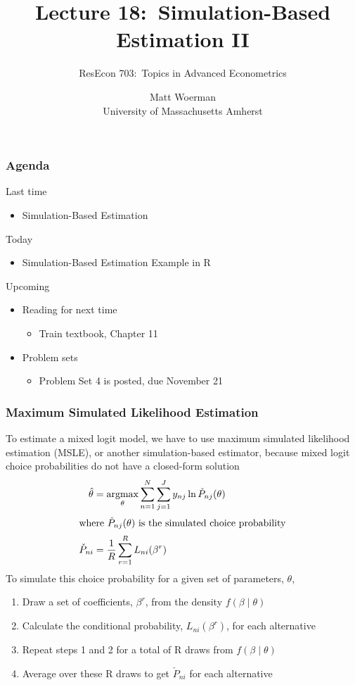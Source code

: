 \documentclass{beamer}\usepackage[]{graphicx}\usepackage[]{color}
\title[Lecture 18:\ Simulation-Based Estimation II]{Lecture 18:\ Simulation-Based Estimation II}
\author[ResEcon 703:\ Advanced Econometrics]{ResEcon 703:\ Topics in Advanced Econometrics}
\date{Matt Woerman\\University of Massachusetts Amherst}
\DeclareMathOperator*{\argmax}{argmax}
\begin{document}
{ 
\begin{frame}[noframenumbering]
    \titlepage
\end{frame}
}

\begin{frame}\frametitle{Agenda}
    Last time
    \begin{itemize}
        \item Simulation-Based Estimation
    \end{itemize}
    \vspace{2ex}
    Today
    \begin{itemize}
        \item Simulation-Based Estimation Example in R
    \end{itemize}
    \vspace{2ex}
    Upcoming
    \begin{itemize}
        \item Reading for next time
        \begin{itemize}
            \item Train textbook, Chapter 11
        \end{itemize}
        \item Problem sets
        \begin{itemize}
            \item Problem Set 4 is posted, due November 21
        \end{itemize}
    \end{itemize}
\end{frame}

\begin{frame}\frametitle{Maximum Simulated Likelihood Estimation}
	To estimate a mixed logit model, we have to use maximum simulated likelihood estimation (MSLE), or another simulation-based estimator, because mixed logit choice probabilities do not have a closed-form solution 
	\begin{align*}
    	\hat{\theta} &= \argmax_\theta \sum_{n = 1}^N \sum_{j = 1}^J y_{nj} \ln \check{P}_{nj}(\theta) \\
    	\intertext{where $\check{P}_{nj}(\theta)$ is the simulated choice probability}
    	\check{P}_{ni} &= \frac{1}{R} \sum_{r = 1}^R L_{ni}(\beta^r)
    \end{align*}
    To simulate this choice probability for a given set of parameters, $\theta$,
    \begin{enumerate}
        \item Draw a set of coefficients, $\beta^r$, from the density $f(\beta \mid \theta)$
        \item Calculate the conditional probability, $L_{ni}(\beta^r)$, for each alternative
        \item Repeat steps 1 and 2 for a total of R draws from $f(\beta \mid \theta)$
        \item Average over these R draws to get $\check{P}_{ni}$ for each alternative
    \end{enumerate}
\end{frame}
\end{document}
